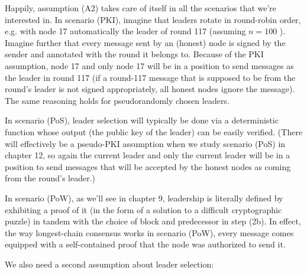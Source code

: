 Happily, assumption (A2) takes care of itself in all the scenarios that we're interested in. In scenario (PKI), imagine that leaders rotate in round-robin order, e.g. with node 17 automatically the leader of round 117 (assuming $n=100$ ). Imagine further that every message sent by an (honest) node is signed by the sender and annotated with the round it belongs to. Because of the PKI assumption, node 17 and only node 17 will be in a position to send messages as the leader in round 117 (if a round-117 message that is supposed to be from the round's leader is not signed appropriately, all honest nodes ignore the message). The same reasoning holds for pseudorandomly chosen leaders.

In scenario (PoS), leader selection will typically be done via a deterministic function whose output (the public key of the leader) can be easily verified. (There will effectively be a pseudo-PKI assumption when we study scenario (PoS) in chapter 12, so again the current leader and only the current leader will be in a position to send messages that will be accepted by the honest nodes as coming from the round's leader.)

In scenario (PoW), as we'll see in chapter 9, leadership is literally defined by exhibiting a proof of it (in the form of a solution to a difficult cryptographic puzzle) in tandem with the choice of block and predecessor in step (2b). In effect, the way longest-chain consensus works in scenario (PoW), every message comes equipped with a self-contained proof that the node was authorized to send it.

We also need a second assumption about leader selection:


